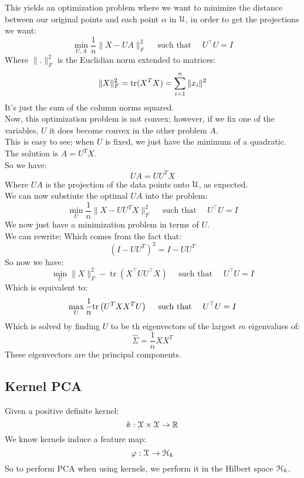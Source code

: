 \documentclass[12pt]{article}
\begin{document}
This yields an optimization problem
where we want to minimize the distance between our
original points and each point $\alpha$ in $\mathcal{U}$,
in order to get the projections we want:
\[ \min_{U, A} \frac{1}{n} \| X - UA \|_F^2 \quad 
\text{ such that } \quad U^\top U = I \]
Where $\|.\|^2_F$ is the Euclidian norm extended to
matrices:
\[ \|X\|^2_F = \text{tr}(X^TX) = \sum_{i=1}^n \|x_i\|^2 \]
It's just the sum of the column norms squared. \\

Now, this optimization problem is not convex;
however, if we fix one of the variables, $U$ 
it does become convex in the other problem $A$. \\
This is easy to see; when $U$ is fixed, we
just have the minimum of a quadratic. \\
The solution is $A = U^TX$. \\

So we have:
\[ UA = UU^TX \]
Where $UA$ is the projection of the data points onto
$\mathcal{U}$, as expected. \\

We can now substiute the optimal $UA$ into the
problem:
\[ \min_{U} \frac{1}{n} \| X - UU^TX \|_F^2 \quad 
\text{ such that } \quad U^\top U = I \]
We now just have a minimization problem in terms of $U$. \\
We can rewrite:
Which comes from the fact that:
\[ (I - UU^T)^2 = I - UU^T \]
So now we have:
\[ \min_{U} \|X\|_F^2 - \operatorname{tr}
\left(X^\top UU^\top X\right) \quad 
\text{ such that } \quad U^\top U = I \]
Which is equivalent to:
\[ \max_{U} \dfrac{1}{n}\text{tr}\left( U^TXX^TU \right) \quad 
\text{ such that } \quad U^\top U = I \]
Which is solved by finding $U$ to be th eigenvectors
of the largest $m$ eigenvalues of:
\[ \hat{\Sigma} = \frac{1}{n} XX^T \]
These eigenvectors are the principal components. \\

\newpage


\subsection*{Kernel PCA}

Given a positive definite kernel:
\[ k: \mathcal{X} \times \mathcal{X} \to \mathbb{R} \]
We know kernels induce a feature map:
\[ \varphi: \mathcal{X} \to \mathcal{H}_k \]
So to perform PCA when using kernels,
we perform it in the Hilbert space $\mathcal{H}_k$. \\
\end{document}
